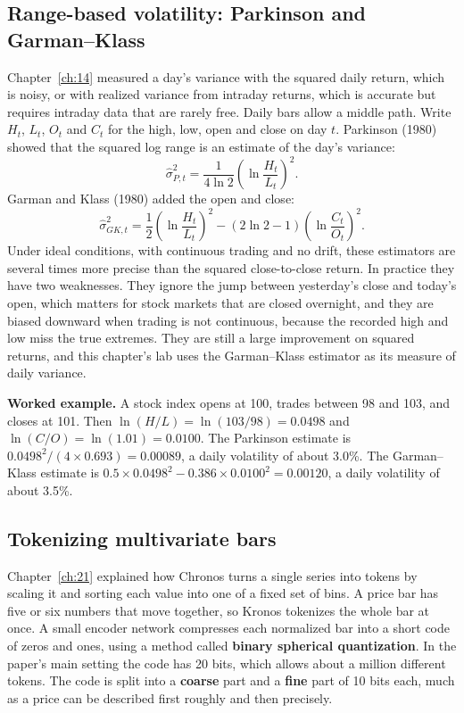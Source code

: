 \subsection{Range-based volatility: Parkinson and Garman--Klass}

Chapter~\ref{ch:14} measured a day's variance with the squared daily return, which is noisy, or with realized variance from intraday returns, which is accurate but requires intraday data that are rarely free. Daily bars allow a middle path. Write $H_t$, $L_t$, $O_t$ and $C_t$ for the high, low, open and close on day $t$. Parkinson (1980) showed that the squared log range is an estimate of the day's variance:
\begin{equation}
  \hat\sigma^2_{P,t} = \frac{1}{4 \ln 2} \left(\ln \frac{H_t}{L_t}\right)^2.
  \label{eq:22-parkinson}
\end{equation}
Garman and Klass (1980) added the open and close:
\begin{equation}
  \hat\sigma^2_{GK,t} = \frac{1}{2} \left(\ln \frac{H_t}{L_t}\right)^2 - \left(2\ln 2 - 1\right) \left(\ln \frac{C_t}{O_t}\right)^2.
  \label{eq:22-gk}
\end{equation}
Under ideal conditions, with continuous trading and no drift, these estimators are several times more precise than the squared close-to-close return. In practice they have two weaknesses. They ignore the jump between yesterday's close and today's open, which matters for stock markets that are closed overnight, and they are biased downward when trading is not continuous, because the recorded high and low miss the true extremes. They are still a large improvement on squared returns, and this chapter's lab uses the Garman--Klass estimator as its measure of daily variance.

\textbf{Worked example.} A stock index opens at 100, trades between 98 and 103, and closes at 101. Then $\ln(H/L) = \ln(103/98) = 0.0498$ and $\ln(C/O) = \ln(1.01) = 0.0100$. The Parkinson estimate is $0.0498^2/(4 \times 0.693) = 0.00089$, a daily volatility of about 3.0\%. The Garman--Klass estimate is $0.5 \times 0.0498^2 - 0.386 \times 0.0100^2 = 0.00120$, a daily volatility of about 3.5\%.

\subsection{Tokenizing multivariate bars}

Chapter~\ref{ch:21} explained how Chronos turns a single series into tokens by scaling it and sorting each value into one of a fixed set of bins. A price bar has five or six numbers that move together, so Kronos tokenizes the whole bar at once. A small encoder network compresses each normalized bar into a short code of zeros and ones, using a method called \textbf{binary spherical quantization}. In the paper's main setting the code has 20 bits, which allows about a million different tokens. The code is split into a \textbf{coarse} part and a \textbf{fine} part of 10 bits each, much as a price can be described first roughly and then precisely.

